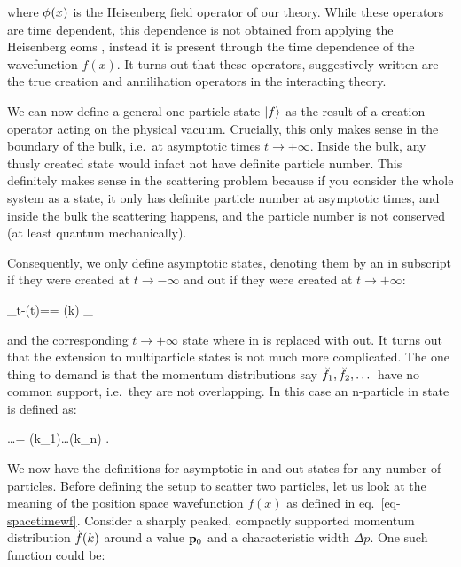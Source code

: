 \documentclass[
  11pt,
  a4paper,
  DIV=11,
  numbers=noendperiod,
  twoside]{scrreprt}
\let\[\relax \let\]\relax %
\DeclareRobustCommand{\[}{\begin{equation}}
\DeclareRobustCommand{\]}{\end{equation}}
\begin{document}
where \(\scf(x)\) is the Heisenberg field operator of our theory. While
these operators are time dependent, this dependence is not obtained from
applying the Heisenberg \glspl{eom} ,
instead it is present through the time dependence of the wavefunction
\(f(x)\). It turns out that these operators, suggestively written are
the true creation and annilihation operators in the interacting theory.

We can now define a general one particle state \(\ket{f}\) as the result
of a creation operator acting on the physical vacuum. Crucially, this
only makes sense in the boundary of the bulk, i.e.~at asymptotic times
\(t\to\pm\infty\). Inside the bulk, any thusly created state
would infact not have definite particle number. This definitely makes
sense in the scattering problem because if you consider the whole system
as a state, it only has definite particle number at asymptotic times,
and inside the bulk the scattering happens, and the particle number is
not conserved (at least quantum mechanically).

Consequently, we only define asymptotic states, denoting them by an
\(\text{in}\) subscript if they were created at \(t\to-\infty\) and
\(\text{out}\) if they were created at \(t\to+\infty\):

\[ 
\lim_{t\to-\infty}\createop[f](t)\physvack=\createop[f;\text{in}]\physvack=\int {} (k) \underbracket{\createop[\tv{k}]\physvack}_{\momket[k]}
\]

and the corresponding \(t \to +\infty\) state where in is replaced with
out. It turns out that the extension to multiparticle states is not much
more complicated. The one thing to demand is that the momentum
distributions say \(\shellft{f_1},\shellft{f_2},\dots\) have no common
support, i.e.~they are not overlapping. In this case an n-particle in
state is defined as:

\[
\createop[f_1;\text{in}]\createop[f_2;\text{in}]\dots\createop[f_n;\text{in}]\physvack=\int {} (k_1)\dots{}(k_n) \momket[k_1,\dots,k_n]. 
\]

We now have the definitions for asymptotic in and out states for any
number of particles. Before defining the setup to scatter two particles,
let us look at the meaning of the position space wavefunction \(f(x)\)
as defined in eq.~\ref{eq-spacetimewf}. Consider a sharply peaked,
compactly supported momentum distribution \(\shellft{f}(k)\) around a
value \(\tv[0]{p}\) and a characteristic width \(\Delta p\). One such
function could be:
\end{document}
